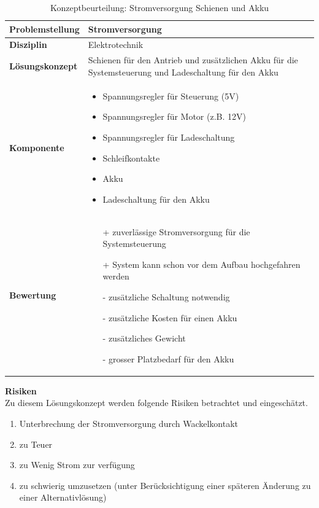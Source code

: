 \documentclass[../../../main.tex]{subfiles}
\begin{document}
    \begin{flushleft}
        \begin{table}[H]
        \begin{tabular}{ | l | p{11cm} |}
        \hline
        \textbf{Problemstellung} & Stromversorgung \\ \hline
        \textbf{Disziplin} & Elektrotechnik \\ \hline
        \textbf{Lösungskonzept} & Schienen für den Antrieb und zusätzlichen Akku für die Systemsteuerung und Ladeschaltung für den Akku\\ \hline
        \textbf{Komponente} & \begin{itemize}
            \item Spannungsregler für Steuerung (5V)
            \item Spannungsregler für Motor (z.B. 12V)
            \item Spannungsregler für Ladeschaltung
            \item Schleifkontakte
            \item Akku
            \item Ladeschaltung für den Akku
            \end{itemize}\\ \hline
        \textbf{Bewertung} &  \begin{itemize}
                                \item[+] zuverlässige Stromversorgung für die Systemsteuerung
                                \item[+] System kann schon vor dem Aufbau hochgefahren werden 
                                \item[-] zusätzliche Schaltung notwendig 
                                \item[-] zusätzliche Kosten für einen Akku
                                \item[-] zusätzliches Gewicht
                                \item[-] grosser Platzbedarf für den Akku 
                              \end{itemize} \\ \hline
        \end{tabular}
        \caption{Konzeptbeurteilung: Stromversorgung Schienen und Akku}
        \label{tab:strom_konzept_schienen_und_akku}
    \end{table}
    \end{flushleft}

    \textbf{Risiken}\\
    Zu diesem Lösungskonzept werden folgende Risiken betrachtet und eingeschätzt.
    \begin{enumerate}[I]
        \item Unterbrechung der Stromversorgung durch Wackelkontakt
        \item zu Teuer
        \item zu Wenig Strom zur verfügung
        \item zu schwierig umzusetzen (unter Berücksichtigung einer späteren Änderung zu einer Alternativlösung)
    \end{enumerate}
\end{document}
